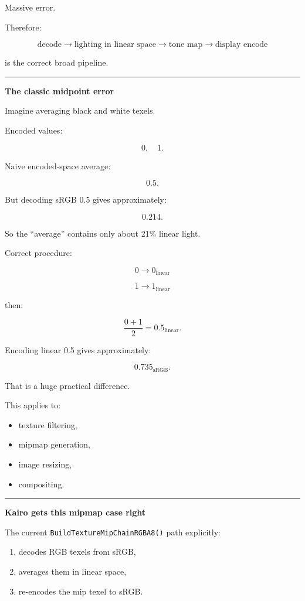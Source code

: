 Massive error.

Therefore:

\[
\boxed{
\text{decode}
\rightarrow
\text{lighting in linear space}
\rightarrow
\text{tone map}
\rightarrow
\text{display encode}
}
\]

is the correct broad pipeline.

\begin{center}\rule{0.5\linewidth}{0.5pt}\end{center}

\textbf{The classic midpoint error}

Imagine averaging black and white texels.

Encoded values:

\[
0,\quad1.
\]

Naive encoded-space average:

\[
0.5.
\]

But decoding sRGB 0.5 gives approximately:

\[
0.214.
\]

So the ``average'' contains only about 21\% linear light.

Correct procedure:

\[
0\rightarrow0_{\text{linear}}
\]

\[
1\rightarrow1_{\text{linear}}
\]

then:

\[
\frac{0+1}{2}=0.5_{\text{linear}}.
\]

Encoding linear 0.5 gives approximately:

\[
\boxed{0.735_{\text{sRGB}}}.
\]

That is a huge practical difference.

This applies to:

\begin{itemize}
\tightlist
\item
  texture filtering,
\item
  mipmap generation,
\item
  image resizing,
\item
  compositing.
\end{itemize}

\begin{center}\rule{0.5\linewidth}{0.5pt}\end{center}

\textbf{Kairo gets this mipmap case right}

The current \texttt{BuildTextureMipChainRGBA8()} path explicitly:

\begin{enumerate}
\def\labelenumi{\arabic{enumi}.}
\tightlist
\item
  decodes RGB texels from sRGB,
\item
  averages them in linear space,
\item
  re-encodes the mip texel to sRGB.
\end{enumerate}

